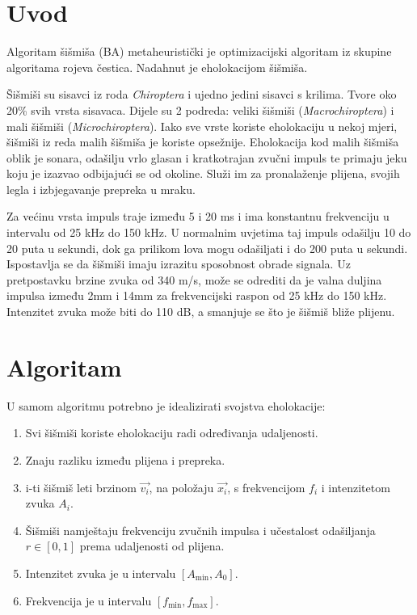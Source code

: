 \section{Uvod}
\hspace{\parindent}Algoritam šišmiša\cite{Yang2010} (BA) metaheuristički je optimizacijski algoritam iz skupine algoritama rojeva čestica. Nadahnut je eholokacijom šišmiša. 

\hspace{\parindent} Šišmiši su sisavci iz roda \textit{Chiroptera} i ujedno jedini sisavci s krilima. Tvore oko 20\% svih vrsta sisavaca.  Dijele su 2 podreda: veliki šišmiši (\textit{Macrochiroptera}) i mali šišmiši (\textit{Microchiroptera}). Iako sve vrste koriste eholokaciju u nekoj mjeri,  šišmiši iz reda malih šišmiša je koriste opsežnije.\cite{netopiri}  Eholokacija kod malih šišmiša oblik je sonara, odašilju vrlo glasan i kratkotrajan zvučni impuls te primaju jeku koju je izazvao odbijajući se od okoline. Služi im za pronalaženje plijena, svojih legla i izbjegavanje prepreka u mraku. 

\hspace{\parindent} Za većinu vrsta impuls traje između 5 i 20 ms i ima konstantnu frekvenciju u intervalu od 25 kHz do 150 kHz. U normalnim uvjetima taj impuls odašilju 10 do 20 puta u sekundi, dok  ga prilikom lova mogu odašiljati i do 200 puta u sekundi. Ispostavlja se da šišmiši imaju izrazitu sposobnost obrade signala. Uz pretpostavku brzine zvuka od 340 m/s, može se odrediti da je valna duljina impulsa između 2mm i 14mm za frekvencijski raspon od 25 kHz do 150 kHz. Intenzitet zvuka može biti do 110 dB, a smanjuje se što je šišmiš bliže plijenu.

\section{Algoritam}
\hspace{\parindent}U samom algoritmu potrebno je idealizirati svojstva eholokacije:
\begin{enumerate}
	\item Svi šišmiši koriste eholokaciju radi određivanja udaljenosti.
        \item Znaju razliku između plijena i prepreka.
	\item i-ti šišmiš leti brzinom $\vec{v_i}$, na položaju $\vec{x_i}$, s frekvencijom $f_i$ i intenzitetom zvuka $A_i$.
 \item Šišmiši namještaju frekvenciju zvučnih impulsa i učestalost odašiljanja $r \in [0,1]$ prema udaljenosti od plijena.
	\item Intenzitet zvuka je u intervalu $[A_{\text{min}}, A_0]$.
 \item Frekvencija je u intervalu $[f_{\text{min}},f_{\text{max}}]$.
\end{enumerate}


